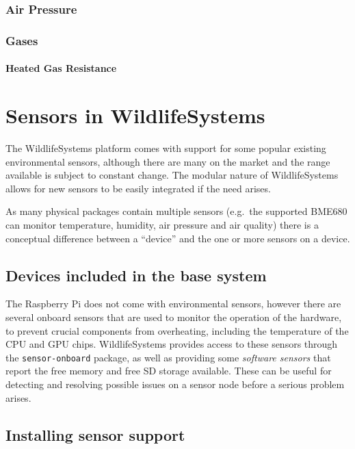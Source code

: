 \documentclass[
]{book}
\begin{document}
\subsection{Air Pressure}\label{air-pressure}

\subsection{Gases}\label{gases}

\subsubsection{Heated Gas Resistance}\label{heated-gas-resistance}

\chapter{Sensors in WildlifeSystems}\label{sensors-in-wildlifesystems}

The WildlifeSystems platform comes with support for some popular existing environmental sensors, although there are many on the market and the range available is subject to constant change. The modular nature of WildlifeSystems allows for new sensors to be easily integrated if the need arises.

As many physical packages contain multiple sensors (e.g.~the supported BME680 can monitor temperature, humidity, air pressure and air quality) there is a conceptual difference between a ``device'' and the one or more sensors on a device.

\section{Devices included in the base system}\label{devices-included-in-the-base-system}

The Raspberry Pi does not come with environmental sensors, however there are several onboard sensors that are used to monitor the operation of the hardware, to prevent crucial components from overheating, including the temperature of the CPU and GPU chips. WildlifeSystems provides access to these sensors through the \texttt{sensor-onboard} package, as well as providing some \emph{software sensors} that report the free memory and free SD storage available. These can be useful for detecting and resolving possible issues on a sensor node before a serious problem arises.

\section{Installing sensor support}\label{installing-sensor-support}
\end{document}
